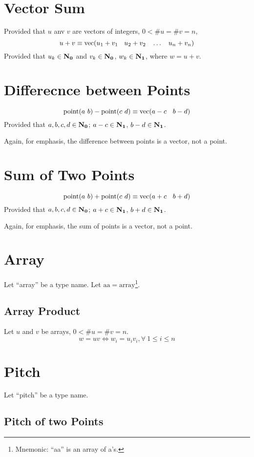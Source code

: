 \documentclass{article}
\begin{document}
\section{Vector Sum}

Provided that $u$ anv $v$ are vectors of integers, $0<\#u=\#v=n$,
$$u+v\equiv \mathrm{vec}(u_1 + v_1\en u_2 + v_2\en \ldots\en u_n + v_n)$$
Provided that $u_k\in\mathbf{N_0}$ and $v_k\in\mathbf{N_0}$,
$w_k\in\mathbf{N_1}$,
where $w=u+v$.

\section{Differecnce between Points}

$$\mathrm{point}(a\ b) - \mathrm{point}(c\ d)\equiv
\mathrm{vec}(a - c\en b - d)$$
Provided that $a, b, c, d\in \mathbf{N_0}$; $a-c\in\mathbf{N_1}$, $b-d\in\mathbf{N_1}$.

Again, for emphasis, the difference between points is a vector, not a point.

\section{Sum of Two Points}
$$\mathrm{point}(a\ b) + \mathrm{point}(c\ d)\equiv
\mathrm{vec}(a + c\en b + d)$$
Provided that $a, b, c, d\in \mathbf{N_0}$; $a+c\in\mathbf{N_1}$, $b+d\in\mathbf{N_1}$.

Again, for emphasis, the sum of points is a vector, not a point.

\section{Array}
Let ``array'' be a type name.
Let $\mathrm{aa}=\mathrm{array}$\footnote{Mnemonic: ``aa'' is an array of a's.}.

\subsection{Array Product}
Let $u$ and $v$ be arrays, $0<\#u=\#v=n$.
$$w=uv\Leftrightarrow w_i = u_iv_i, \forall\ 1\le i\le n$$

\section{Pitch}

Let ``pitch'' be a type name.

\subsection{Pitch of two Points}
\end{document}
